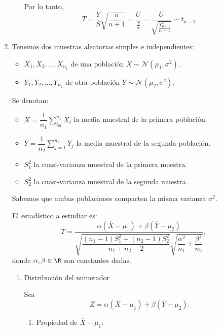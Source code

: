 \begin{enumerate}[label=\color{red}\textbf{\arabic*)}]
\begin{enumerate}[label=\arabic*)]
        Por lo tanto, \[
        T=\dfrac{Y}{S}\sqrt{\dfrac{n}{n+1}}=\dfrac{U}{\frac{S}{\sigma} } =\dfrac{U}{\sqrt{\frac{\chi_{n-1}^2}{n-1} } }\sim t_{n-1}.
        \] 
\end{enumerate}
\item {} 

Tenemos dos muestras aleatorias simples e independientes:
\begin{itemize}[label=\textbullet]
    \item $X_1,X_2,\dots,X_{n_1}$ de una población $X\sim \mathcal{N}(\mu_1,\sigma^2)$.
    \item $Y_1,Y_2,\dots,Y_{n_2}$ de otra población $Y\sim \mathcal{N}(\mu_2,\sigma^2)$.
\end{itemize}
Se denotan:
\begin{itemize}[label=\textbullet]
    \item $\overline{X}=\dfrac{1}{n_1}\sum_{i_{01}}^{n_1} X_i$ la media muestral de la primera población.
    \item $\overline{Y}=\dfrac{1}{n_2}\sum_{j=1}^{n_2} Y_j$ la media muestral de la segunda población.
    \item $S_1^2$ la cuasi-varianza muestral de la primera muestra.
    \item $S_2^2$ la cuasi-varianza muestral de la segunda muestra.
\end{itemize}
Sabemos que ambas poblaciones comparten la misma varianza $\sigma^2$.

El estadístico a estudiar es: \[
T=\dfrac{\alpha(\overline{X}-\mu_1)+\beta(\overline{Y}-\mu_2)}{\sqrt{\dfrac{(n_1-1)S_1^2+(n_2-1)S_2^2}{n_1+n_2-2}}\sqrt{\dfrac{\alpha^2}{n_1}+\dfrac{\beta^2}{n_2}}  },
\] 
donde $\alpha,\beta \in \R$ son constantes dadas.

\begin{enumerate}[label=\arabic*)]
    \item Distribución del numerador

        Sea \[
        Z=\alpha(\overline{X}-\mu_1)+\beta(\overline{Y}-\mu_2).
        \] 
        \begin{enumerate}[label=\arabic*)]
            \item Propiedad de $\overline{X}-\mu_1$:


\end{enumerate}
\end{enumerate}
\end{enumerate}
